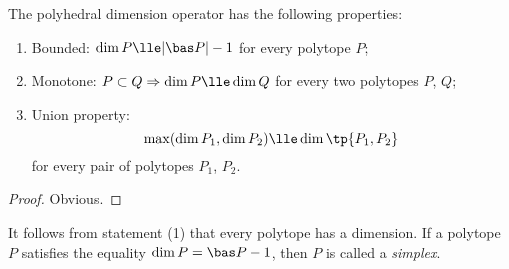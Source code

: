 \documentclass[12pt, a4paper]{article}
\begin{document}
\begin{proposition}\label{poly-dim}
    The polyhedral dimension operator has the following properties:

    \begin{enumerate}
        \item Bounded: \(\dim P \lle |\bas P| - 1\) for every polytope \(P\);
        \item Monotone: \(P \subset Q \Rightarrow \dim P \lle \dim Q\) for every two polytopes \(P\), \(Q\);
        \item Union property: \[\max (\dim{P_1}, \dim{P_2}) \lle \dim{\tp{P_1, P_2}}\] for every pair of polytopes \(P_1\), \(P_2\).
    \end{enumerate}
\end{proposition}

\begin{proof}
    Obvious.
\end{proof}


\begin{corollary}
    It follows from statement (1) that every polytope has a dimension. If a polytope \(P\) satisfies the equality \(\dim P = \bas P - 1\), then \(P\) is called a \textit{simplex}.
\end{corollary}
\end{document}
